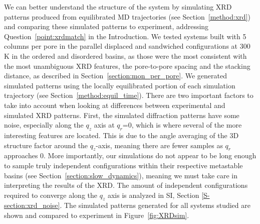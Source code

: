 \documentclass[journal=jpcbfk,manuscript=article]{achemso}
\begin{document}
  We can better understand the structure of the system by simulating XRD
  patterns produced from equilibrated MD trajectories (see
  Section~\ref{method:xrd}) and comparing these simulated patterns to experiment,
  addressing Question~\ref{point:xrdmatch} in the Introduction. We tested systems
  built with 5 columns per pore in the parallel displaced and sandwiched
  configurations at 300 K in the ordered and disordered basins, as those were the
  most consistent with the most unambiguous XRD features, the pore-to-pore
  spacing and the stacking distance, as described in
  Section~\ref{section:mon_per_pore}.  We generated simulated patterns using the
  locally equilibrated portion of each simulation trajectory (see
  Section~\ref{method:equil_time}). There are two important factors to take into
  account when looking at differences between experimental and simulated XRD
  patterns.  First, the simulated diffraction patterns have some noise,
  especially along the $q_z$ axis at $q_r$=0, which is where several of the more
  interesting features are located. This is due to the angle averaging of the 3D
  structure factor around the $q_z$-axis, meaning there are fewer samples as
  $q_r$ approaches 0.  More importantly, our simulations do not appear to be long
  enough to sample truly independent configurations within their respective
  metastable basins (see Section~\ref{section:slow_dynamics}), meaning we must
  take care in interpreting the results of the XRD. The amount of independent
  configurations required to converge along the $q_z$ axis is analyzed in SI,
  Section \ref{S-section:xrd_noise}. The simulated patterns generated for all
  systems studied are shown and compared to experiment in
  Figure~\ref{fig:XRDsim}.
\end{document}
